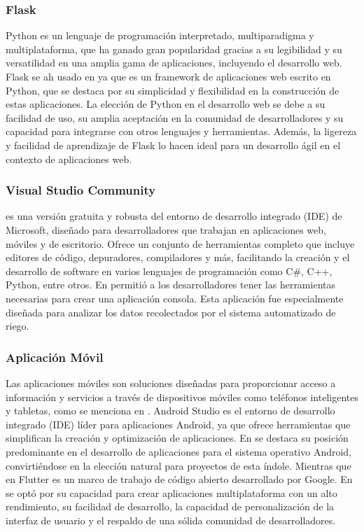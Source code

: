 \subsubsection*{Flask}
Python es un lenguaje de programación interpretado, multiparadigma y multiplataforma, que ha ganado gran popularidad gracias a su legibilidad y su versatilidad en una amplia gama de aplicaciones, incluyendo el desarrollo web. Flask se ah usado en \cite{noauthor_fuzzy_2023} ya que es un framework de aplicaciones web escrito en Python, que se destaca por su simplicidad y flexibilidad en la construcción de estas aplicaciones. La elección de Python en el desarrollo web se debe a su facilidad de uso, su amplia aceptación en la comunidad de desarrolladores y su capacidad para integrarse con otros lenguajes y herramientas. Además, la ligereza y facilidad de aprendizaje de Flask lo hacen ideal para un desarrollo ágil en el contexto de aplicaciones web.

\subsubsection*{Visual Studio Community}
es una versión gratuita y robusta del entorno de desarrollo integrado (IDE) de Microsoft, diseñado para desarrolladores que trabajan en aplicaciones web, móviles y de escritorio. Ofrece un conjunto de herramientas completo que incluye editores de código, depuradores, compiladores y más, facilitando la creación y el desarrollo de software en varios lenguajes de programación como C\#, C++, Python, entre otros. En \cite{alcivar_dominguez_sistema_2018} permitió a los desarrolladores tener las herramientas necesarias para crear una aplicación consola. Esta aplicación fue especialmente diseñada para analizar los datos recolectados por el sistema automatizado de riego.

\subsubsection*{Aplicación Móvil}
Las aplicaciones móviles son soluciones diseñadas para proporcionar acceso a información y servicios a través de dispositivos móviles como teléfonos inteligentes y tabletas, como se menciona en \cite{noauthor_fuzzy_2023}. Android Studio es el entorno de desarrollo integrado (IDE) líder para aplicaciones Android, ya que ofrece herramientas que simplifican la creación y optimización de aplicaciones. En \cite{castillo_herrero_desarrollo_2020} se destaca su posición predominante en el desarrollo de aplicaciones para el sistema operativo Android, convirtiéndose en la elección natural para proyectos de esta índole. Mientras que en Flutter es un marco de trabajo de código abierto desarrollado por Google. En \cite{ramos_galindo_diseno_2023} se optó por su capacidad para crear aplicaciones multiplataforma con un alto rendimiento, su facilidad de desarrollo, la capacidad de personalización de la interfaz de usuario y el respaldo de una sólida comunidad de desarrolladores.

